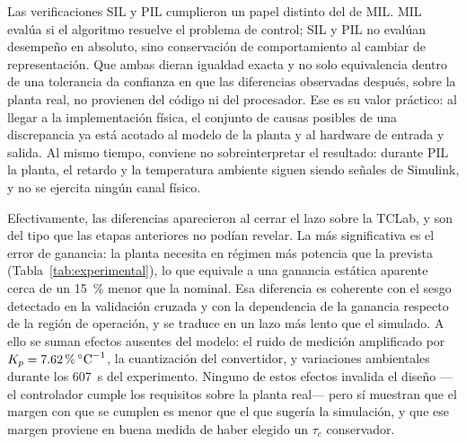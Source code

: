 Las verificaciones SIL y PIL cumplieron un papel distinto del de MIL. MIL evalúa si el algoritmo
resuelve el problema de control; SIL y PIL no evalúan desempeño en absoluto, sino conservación de
comportamiento al cambiar de representación. Que ambas dieran igualdad exacta y no solo equivalencia
dentro de una tolerancia da confianza en que las diferencias observadas después, sobre la planta
real, no provienen del código ni del procesador. Ese es su valor práctico: al llegar a la
implementación física, el conjunto de causas posibles de una discrepancia ya está acotado al modelo
de la planta y al hardware de entrada y salida. Al mismo tiempo, conviene no sobreinterpretar el
resultado: durante PIL la planta, el retardo y la temperatura ambiente siguen siendo señales de
Simulink, y no se ejercita ningún canal físico.

Efectivamente, las diferencias aparecieron al cerrar el lazo sobre la TCLab, y son del tipo que las
etapas anteriores no podían revelar. La más significativa es el error de ganancia: la planta
necesita en régimen más potencia que la prevista (Tabla~\ref{tab:experimental}), lo que equivale a
una ganancia estática aparente cerca de un \SI{15}{\percent} menor que la nominal. Esa
diferencia es coherente con el sesgo detectado en la validación cruzada y con la dependencia de la
ganancia respecto de la región de operación, y se traduce en un lazo más lento que el simulado. A
ello se suman efectos ausentes del modelo: el ruido de medición amplificado por
$K_p = \SI{7.62}{\percent\per\celsius}$, la cuantización del convertidor, y variaciones ambientales
durante los \SI{607}{\second} del experimento. Ninguno de estos efectos invalida el diseño ---el
controlador cumple los requisitos sobre la planta real--- pero sí muestran que el margen con que se
cumplen es menor que el que sugería la simulación, y que ese margen proviene en buena medida de
haber elegido un $\tau_c$ conservador.
